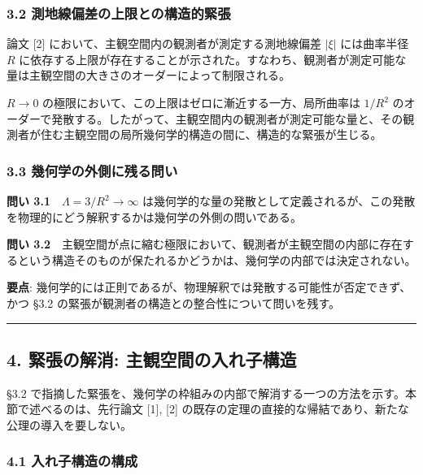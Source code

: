 \documentclass[a4paper,11pt]{ltjsarticle}
\theoremstyle{definition}
\begin{document}
\subsubsection{3.2 測地線偏差の上限との構造的緊張}\label{ux6e2cux5730ux7ddaux504fux5deeux306eux4e0aux9650ux3068ux306eux69cbux9020ux7684ux7dcaux5f35}

論文 {[}2{]} において、主観空間内の観測者が測定する測地線偏差 \(|\xi|\) には曲率半径 \(R\) に依存する上限が存在することが示された。すなわち、観測者が測定可能な量は主観空間の大きさのオーダーによって制限される。

\(R \to 0\) の極限において、この上限はゼロに漸近する一方、局所曲率は \(1/R^2\) のオーダーで発散する。したがって、主観空間内の観測者が測定可能な量と、その観測者が住む主観空間の局所幾何学的構造の間に、構造的な緊張が生じる。

\subsubsection{3.3 幾何学の外側に残る問い}\label{ux5e7eux4f55ux5b66ux306eux5916ux5074ux306bux6b8bux308bux554fux3044-1}

\textbf{問い 3.1}　\(\Lambda = 3/R^2 \to \infty\) は幾何学的な量の発散として定義されるが、この発散を物理的にどう解釈するかは幾何学の外側の問いである。

\textbf{問い 3.2}　主観空間が点に縮む極限において、観測者が主観空間の内部に存在するという構造そのものが保たれるかどうかは、幾何学の内部では決定されない。

\textbf{要点}: 幾何学的には正則であるが、物理解釈では発散する可能性が否定できず、かつ §3.2 の緊張が観測者の構造との整合性について問いを残す。

\begin{center}\rule{0.5\linewidth}{0.5pt}\end{center}

\subsection{4. 緊張の解消: 主観空間の入れ子構造}\label{ux7dcaux5f35ux306eux89e3ux6d88-ux4e3bux89b3ux7a7aux9593ux306eux5165ux308cux5b50ux69cbux9020}

§3.2 で指摘した緊張を、幾何学の枠組みの内部で解消する一つの方法を示す。本節で述べるのは、先行論文 {[}1{]}, {[}2{]} の既存の定理の直接的な帰結であり、新たな公理の導入を要しない。

\subsubsection{4.1 入れ子構造の構成}\label{ux5165ux308cux5b50ux69cbux9020ux306eux69cbux6210}
\end{document}
